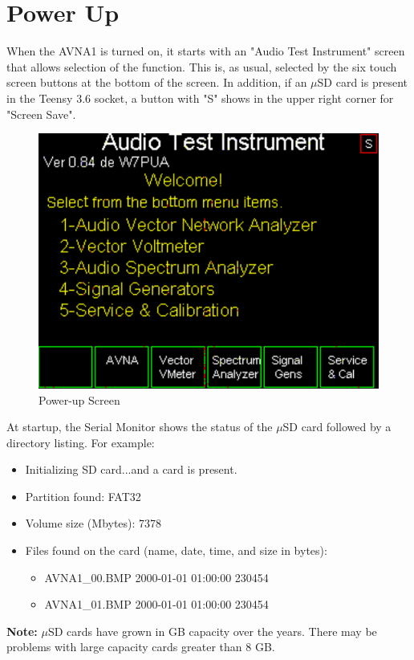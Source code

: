 \section{Power Up}
\label{sect:PwrUp}
When the AVNA1 is turned on, it starts with an "Audio Test Instrument" screen that allows selection of the function.  This is, as usual, selected by the six touch screen buttons at the bottom of the screen.  In addition, if an $\mu$SD card is present in the Teensy 3.6 socket, a button with "S"  shows in the upper right corner for "Screen Save".

\begin{figure}[H]
\begin{center}
\includegraphics[scale=0.75]{./images/AVNA_000.pdf}
\caption{Power-up Screen}
\label{power-up-label}
\end{center}
\end{figure}

At startup, the Serial Monitor shows the status of the $\mu$SD card followed by a directory listing. For example:
\begin{itemize}
  \item Initializing SD card...and a card is present.
  \item Partition found: FAT32
  \item Volume size (Mbytes): 7378
  \item Files found on the card (name, date, time, and size in bytes):
  \begin{itemize}
   \item AVNA1\_00.BMP  2000-01-01 01:00:00 230454
   \item AVNA1\_01.BMP  2000-01-01 01:00:00 230454
   \end{itemize}
\end{itemize}

\textbf{Note:} $\mu$SD cards have grown in GB capacity over the years.  There may be problems with large capacity cards greater than 8 GB.
